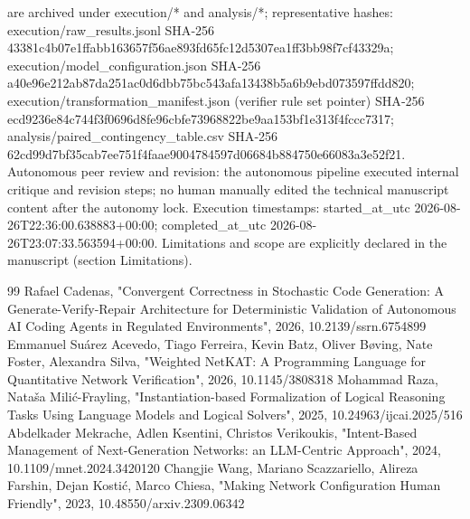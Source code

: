 \documentclass[conference]{IEEEtran}
\begin{document}
are archived under execution/* and analysis/*; representative hashes: execution/raw\_results.jsonl SHA‑256 43381c4b07e1ffabb163657f56ae893fd65fc12d5307ea1ff3bb98f7cf43329a; execution/model\_configuration.json SHA‑256 a40e96e212ab87da251ac0d6dbb75bc543afa13438b5a6b9ebd073597ffdd820; execution/transformation\_manifest.json (verifier rule set pointer) SHA‑256 ecd9236e84c744f3f0696d8fe96cbfe73968822be9aa153bf1e313f4fccc7317; analysis/paired\_contingency\_table.csv SHA‑256 62cd99d7bf35cab7ee751f4faae9004784597d06684b884750e66083a3e52f21. Autonomous peer review and revision: the autonomous pipeline executed internal critique and revision steps; no human manually edited the technical manuscript content after the autonomy lock. Execution timestamps: started\_at\_utc 2026-08-26T22:36:00.638883+00:00; completed\_at\_utc 2026-08-26T23:07:33.563594+00:00. Limitations and scope are explicitly declared in the manuscript (section Limitations).

\begin{thebibliography}{99}
 Rafael Cadenas, "Convergent Correctness in Stochastic Code Generation: A Generate-Verify-Repair Architecture for Deterministic Validation of Autonomous AI Coding Agents in Regulated Environments", 2026, 10.2139/ssrn.6754899
 Emmanuel Suárez Acevedo, Tiago Ferreira, Kevin Batz, Oliver Bøving, Nate Foster, Alexandra Silva, "Weighted NetKAT: A Programming Language for Quantitative Network Verification", 2026, 10.1145/3808318
 Mohammad Raza, Nataša Milić-Frayling, "Instantiation-based Formalization of Logical Reasoning Tasks Using Language Models and Logical Solvers", 2025, 10.24963/ijcai.2025/516
 Abdelkader Mekrache, Adlen Ksentini, Christos Verikoukis, "Intent-Based Management of Next-Generation Networks: an LLM-Centric Approach", 2024, 10.1109/mnet.2024.3420120
 Changjie Wang, Mariano Scazzariello, Alireza Farshin, Dejan Kostić, Marco Chiesa, "Making Network Configuration Human Friendly", 2023, 10.48550/arxiv.2309.06342
\end{thebibliography}
\end{document}
